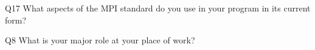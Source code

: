 \begin{description}%
\item{Q17} What aspects of the MPI standard do you use in your program in its current form?%
\item{Q8} What is your major role at your place of work?%
\end{description}%
